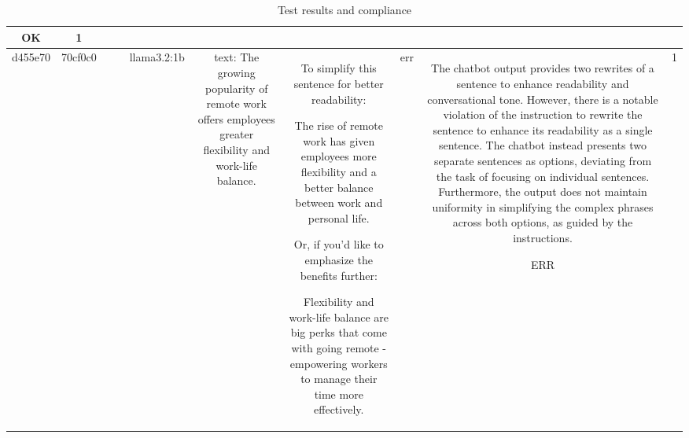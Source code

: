 \begin{table}[h!]
\begin{tabular}{|c|c|c|c|c|c|c|c|c|c|}
OK & 1\\
\hline
d455e70 & 70cf0c0 &  &  & llama3.2:1b & text: The growing popularity of remote work offers employees greater flexibility and work-life balance. & To simplify this sentence for better readability:

The rise of remote work has given employees more flexibility and a better balance between work and personal life.

Or, if you'd like to emphasize the benefits further:

Flexibility and work-life balance are big perks that come with going remote - empowering workers to manage their time more effectively. & err & The chatbot output provides two rewrites of a sentence to enhance readability and conversational tone. However, there is a notable violation of the instruction to rewrite the sentence to enhance its readability as a single sentence. The chatbot instead presents two separate sentences as options, deviating from the task of focusing on individual sentences. Furthermore, the output does not maintain uniformity in simplifying the complex phrases across both options, as guided by the instructions.

ERR & 1
  \end{tabular}
  \caption{Test results and compliance}
  
  \end{table}
  